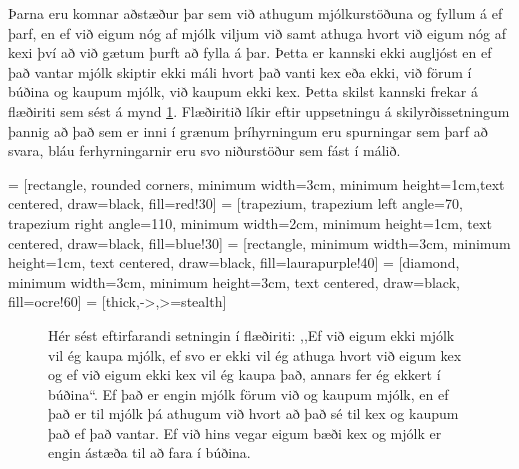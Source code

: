 Þarna eru komnar aðstæður þar sem við athugum mjólkurstöðuna og fyllum á ef þarf, en ef við eigum nóg af mjólk viljum við samt athuga hvort við eigum nóg af kexi því að við gætum þurft að fylla á þar.
Þetta er kannski ekki augljóst en ef það vantar mjólk skiptir ekki máli hvort það vanti kex eða ekki, við förum í búðina og kaupum mjólk, við kaupum ekki kex.
Þetta skilst kannski frekar á flæðiriti sem sést á mynd \ref{fig:flæðirit}.
Flæðiritið líkir eftir uppsetningu á skilyrðissetningum þannig að það sem er inni í grænum þríhyrningum eru spurningar sem þarf að svara, bláu ferhyrningarnir eru svo niðurstöður sem fást í málið.

 = [rectangle, rounded corners, minimum width=3cm, minimum height=1cm,text centered, draw=black, fill=red!30]
 = [trapezium, trapezium left angle=70, trapezium right angle=110, minimum width=2cm, minimum height=1cm, text centered, draw=black, fill=blue!30]
 = [rectangle, minimum width=3cm, minimum height=1cm, text centered, draw=black, fill=laurapurple!40]
 = [diamond, minimum width=3cm, minimum height=3cm, text centered, draw=black, fill=ocre!60]
 = [thick,->,>=stealth]

\vspace{5pt}
\begin{figure}[H]
	\centering
{}
\caption{Hér sést eftirfarandi setningin í flæðiriti: ,,Ef við eigum ekki mjólk vil ég kaupa mjólk, ef svo er ekki vil ég athuga hvort við eigum kex og ef við eigum ekki kex vil ég kaupa það, annars fer ég ekkert í búðina“. Ef það er engin mjólk förum við og kaupum mjólk, en ef það er til mjólk þá athugum við hvort að það sé til kex og kaupum það ef það vantar.
Ef við hins vegar eigum bæði kex og mjólk er engin ástæða til að fara í búðina.}
\label{fig:flæðirit}
\end{figure}
\vspace{5pt}

